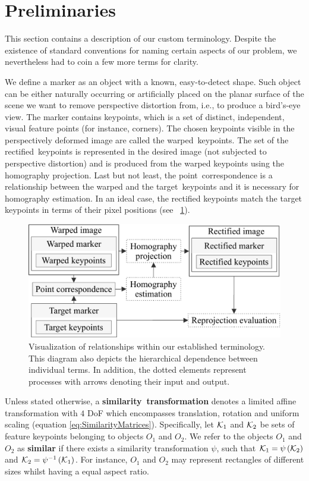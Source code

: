 \section{Preliminaries}
\label{sec:HomographyPreliminaries}

This section contains a description of our custom terminology. Despite the existence of standard conventions for naming certain aspects of our problem, we nevertheless had to coin a few more terms for clarity.

We define a marker as an object with a known, easy-to-detect shape. Such object can be either naturally occurring or artificially placed on the planar surface of the scene we want to remove perspective distortion from, i.e., to produce a bird's-eye view. The marker contains keypoints, which is a set of distinct, independent, visual feature points (for instance, corners). The chosen keypoints visible in the perspectively deformed image are called the \mbox{warped keypoints}. The set of the \mbox{rectified keypoints} is represented in the desired image (not subjected to perspective distortion) and is produced from the warped keypoints using the homography projection. Last but not least, the \mbox{point correspondence} is a relationship between the warped and the \mbox{target keypoints} and it is necessary for homography estimation. In an ideal case, the rectified keypoints match the target keypoints in terms of their pixel positions (see \figstr{}~\ref{fig:HomographyTerminology}).

\begin{figure}[t]
    \centering
    \includegraphics[width=0.6\linewidth]{figures/homography/terminology.pdf}
    \caption[Homography ranking terminology]{Visualization of relationships within our established terminology. This diagram also depicts the hierarchical dependence between individual terms. In addition, the dotted elements represent processes with arrows denoting their input and output.}
    \label{fig:HomographyTerminology}
\end{figure}

Unless stated otherwise, a \mbox{\textbf{similarity transformation}} denotes a limited affine transformation with $4$ DoF which encompasses translation, rotation and uniform scaling (equation \ref{eq:SimilarityMatrices}). Specifically, let $\mathcal{K}_1$ and $\mathcal{K}_2$ be sets of feature keypoints belonging to objects $O_1$ and $O_2$. We refer to the objects $O_1$ and $O_2$ as \mbox{\textbf{similar}} if there exists a similarity transformation $\psi$, such that $\mathcal{K}_1 = {\psi} \left( \mathcal{K}_2 \right)$ and $\mathcal{K}_2 = {\psi^{-1}} \left( \mathcal{K}_1 \right)$. For instance, $O_1$ and $O_2$ may represent rectangles of different sizes whilst having a equal aspect ratio.

